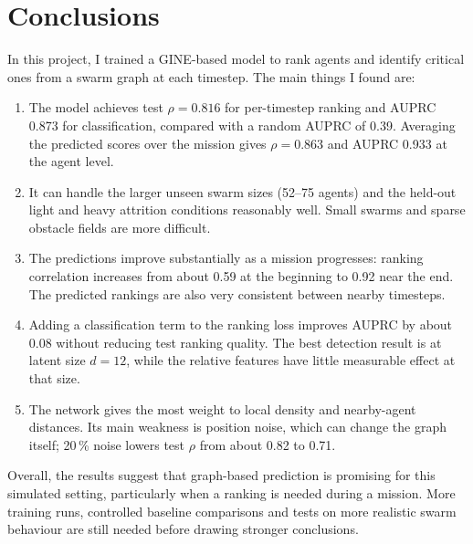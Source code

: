 \documentclass[11pt,a4paper]{article}
\begin{document}
\section{Conclusions}
In this project, I trained a GINE-based model to rank agents and identify critical ones from a swarm graph at
each timestep. The main things I found are:
\begin{enumerate}[label=\arabic*.]
\item The model achieves test $\rho=0.816$ for per-timestep ranking and AUPRC 0.873 for classification,
compared with a random AUPRC of 0.39. Averaging the predicted scores over the mission gives $\rho=0.863$
and AUPRC 0.933 at the agent level.
\item It can handle the larger unseen swarm sizes (52--75 agents) and the held-out light and heavy
attrition conditions reasonably well. Small swarms and sparse obstacle fields are more difficult.
\item The predictions improve substantially as a mission progresses: ranking correlation increases
from about 0.59 at the beginning to 0.92 near the end. The predicted rankings are also very consistent
between nearby timesteps.
\item Adding a classification term to the ranking loss improves AUPRC by about 0.08 without reducing
test ranking quality. The best detection result is at latent size $d=12$, while the relative features
have little measurable effect at that size.
\item The network gives the most weight to local density and nearby-agent distances. Its main weakness
is position noise, which can change the graph itself; 20\,\% noise lowers test $\rho$ from about
0.82 to 0.71.
\end{enumerate}

Overall, the results suggest that graph-based prediction is promising for this simulated setting,
particularly when a ranking is needed during a mission. More training runs, controlled baseline
comparisons and tests on more realistic swarm behaviour are still needed before drawing stronger conclusions.
\end{document}
